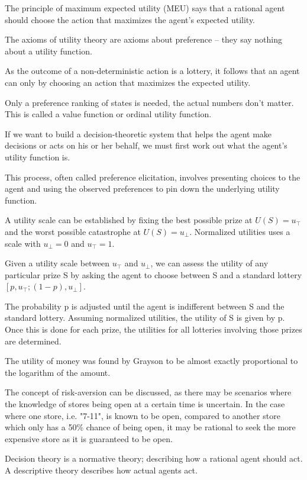 The principle of maximum expected utility (MEU) says that a rational agent should choose the action that maximizes the agent's expected utility.

The axioms of utility theory are axioms about preference -- they say nothing about a utility function.

As the outcome of a non-deterministic action is a lottery, it follows that an agent can only by choosing an action that maximizes the expected utility.

Only a preference ranking of states is needed, the actual numbers don't matter. This is called a value function or ordinal utility function.

If we want to build a decision-theoretic system that helps the agent make decisions or acts on his or her behalf, we must first work out what the agent's utility function is.

This process, often called preference elicitation, involves presenting choices to the agent and using the observed preferences to pin down the underlying utility function.

A utility scale can be established by fixing the best possible prize at $U(S) = u_{\top}$ and the worst possible catastrophe at $U(S) = u_{\bot}$. Normalized utilities uses a scale with $u_{\bot} = 0$ and $u_{\top} = 1$.

Given a utility scale between $u_{\top}$ and $u_{\bot}$, we can assess the utility of any particular prize S by asking the agent to choose between S and a standard lottery $[p, u_{\top}; (1-p), u_{\bot}]$.

The probability p is adjusted until the agent is indifferent between S and the standard lottery. Assuming normalized utilities, the utility of S is given by p. Once this is done for each prize, the utilities for all lotteries involving those prizes are determined.

The utility of money was found by Grayson to be almost exactly proportional to the logarithm of the amount.

The concept of risk-aversion can be discussed, as there may be scenarios where the knowledge of stores being open at a certain time is uncertain. In the case where one store, i.e. "7-11", is known to be open, compared to another store which only has a 50\% chance of being open, it may be rational to seek the more expensive store as it is guaranteed to be open.

Decision theory is a normative theory; describing how a rational agent should act. A descriptive theory describes how actual agents act.

